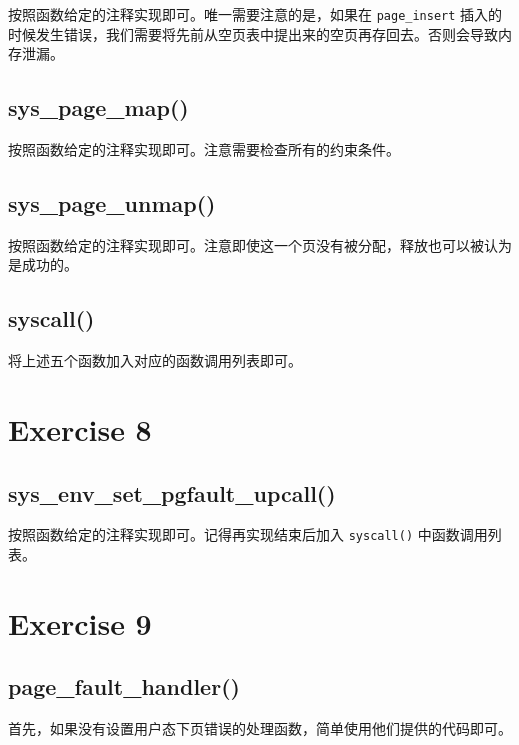 \documentclass[11pt]{article}
\begin{document}
		\par 按照函数给定的注释实现即可。唯一需要注意的是，如果在 \texttt{page\_insert} 插入的时候发生错误，我们需要将先前从空页表中提出来的空页再存回去。否则会导致内存泄漏。
		
	\subsection*{sys\_page\_map()}
	
		\par 按照函数给定的注释实现即可。注意需要检查所有的约束条件。
		
	\subsection*{sys\_page\_unmap()}
		
		\par 按照函数给定的注释实现即可。注意即使这一个页没有被分配，释放也可以被认为是成功的。
		
	\subsection*{syscall()}
	
		\par 将上述五个函数加入对应的函数调用列表即可。
	
	\section{Exercise 8}
		
	\subsection*{sys\_env\_set\_pgfault\_upcall()}
		
		\par 按照函数给定的注释实现即可。记得再实现结束后加入 \texttt{syscall()} 中函数调用列表。
	
	\section{Exercise 9}
		
	\subsection*{page\_fault\_handler()}
		
		\par 首先，如果没有设置用户态下页错误的处理函数，简单使用他们提供的代码即可。
		
\end{document}
